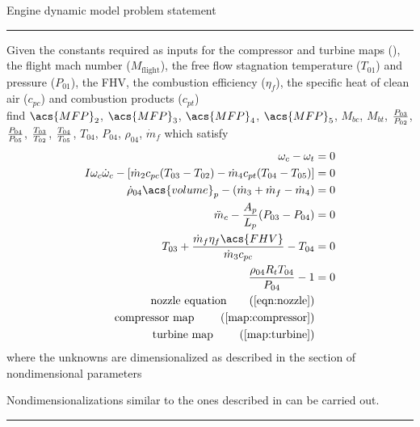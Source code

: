 \begin{table}
\centering
    \caption{Engine dynamic model problem statement}
    \label{model:dynamic}
\begin{minipage}{0.7\textwidth}
    \hrule\vspace{2pt}

    Given the constants required as inputs for the compressor and turbine maps (), 
    the flight mach number ($M_\text{flight}$), the free flow stagnation temperature ($T_{01}$) and pressure ($P_{01}$), 
    the \acf{FHV}, the combustion efficiency ($\eta_f$),
    the specific heat of clean air ($c_{pc}$) and combustion products ($c_{pt}$) \\ 
    find $\acs{MFP}_2$, $\acs{MFP}_3$, $\acs{MFP}_4$, $\acs{MFP}_5$, $M_{bc}$, $M_{bt}$, $\frac{P_{03}}{P_{02}}$, $\frac{P_{04}}{P_{05}}$, $\frac{T_{03}}{T_{02}}$, $\frac{T_{04}}{T_{05}}$, $T_{04}$, $P_{04}$, $\rho_{04}$, $\dot{m}_f$
    which satisfy
\begin{align}
    \omega_c - \omega_t &= 0 \label{eqn:dynamic:rotation} \\
    I \omega_c\dot{\omega}_c - [\dot{m}_2 c_{pc} (T_{03}-T_{02}) - \dot{m}_4 c_{pt}(T_{04}-T_{05})] &= 0 \label{eqn:dynamic:energy}\\
    \dot{\rho}_{04}\acs{volume}_p - (\dot{m}_3 + \dot{m}_f - \dot{m}_4) &= 0 \label{eqn:dynamic:mass} \\
    \ddot{m}_c - \frac{A_p}{L_p}(P_{03}-P_{04}) &=0 \label{eqn:dynamic:momentum} \\
    T_{03} + \frac{\dot{m}_f \eta_f \acs{FHV}}{\dot{m}_3 c_{pc}} - T_{04} &= 0 \label{eqn:dynamic:burn} \\
    \frac{\rho_{04} R_t T_{04}}{P_{04}}  - 1 &= 0\\
    \text{nozzle equation} \tag{\Cref{eqn:nozzle}} \\
    \text{compressor map } \tag{\Cref{map:compressor}} \\
    \text{turbine map    } \tag{\Cref{map:turbine}}
\end{align}
   where the unknowns are dimensionalized as described in the section of nondimensional parameters

   Nondimensionalizations similar to the ones described in  can be carried out.

    \vspace{2pt}\hrule
\end{minipage}
\end{table}

